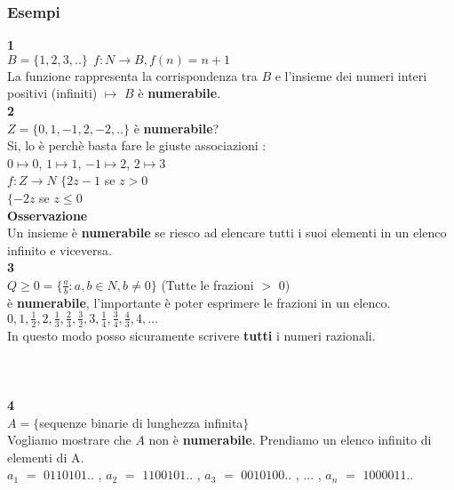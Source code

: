 \documentclass[11pt]{article}
\begin{document}
        \subsubsection{Esempi}
            \textbf{\large 1}\\
            $B=\{1,2,3,..\} \ \ f:N\to B , f(n)=n+1 $ \\
            La funzione rappresenta la corrispondenza tra $B$ e l'insieme dei numeri interi positivi (infiniti) $\mapsto$ $B$ \`e \textbf{numerabile}.\\
            \textbf{\large 2}\\
            $Z=\{0,1,-1,2,-2,..\}$ \`e \textbf{numerabile}? \\
            Si, lo \`e perch\`e basta fare le giuste associazioni : \\
            $0\mapsto 0 $, $1\mapsto1$, $-1\mapsto2$, $2\mapsto3$\\
            $f:Z\to N$ $\{2z-1 $ se $z>0$ \\
            \hspace*{1,8cm} $\{-2z  $ \hspace{0,35cm}se $z\leq0$  \\
            \textbf{Osservazione}\\
            Un insieme \`e \textbf{numerabile} se riesco ad elencare tutti i suoi elementi in un elenco infinito e viceversa.\\
            \textbf{3}\\
            $Q \geq 0 =\{\frac{a}{b}:a,b \in N , b\ne 0\}$ (Tutte le frazioni $>$ 0)\\
            \`e \textbf{numerabile}, l'importante \`e poter esprimere le frazioni in un elenco.\\
            $0,1,\frac{1}{2},2,\frac{1}{3},\frac{2}{3},\frac{3}{2},3,\frac{1}{4},\frac{3}{4},\frac{4}{3},4, ...$\\ In questo modo posso sicuramente scrivere \textbf{tutti} i numeri razionali.\\
            \\\\\\
            \textbf{\large 4}\\
            $A=\{$sequenze binarie di lunghezza infinita$\}$\\
            Vogliamo mostrare che $A$ non \`e \textbf{numerabile}. Prendiamo un elenco infinito di elementi di A.\\
            $a_{1}$ $=$ $0110101..$ , $a_{2}$ $=$ $1100101..$ , $a_{3}$ $=$ $0010100..$ , $...$ , $a_{n}$ $=$ $1000011..$\\
\end{document}
